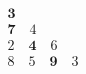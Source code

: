 \documentclass{article}
\begin{document}
	\begin{gather*}
	  \mathbf{3} \\
	  \mathbf{7} \quad 4 \\
	  2 \quad \mathbf{4} \quad 6 \\ 
	  8\quad 5 \quad \mathbf{9} \quad 3 \\ 
	\end{gather*}
\end{document}
